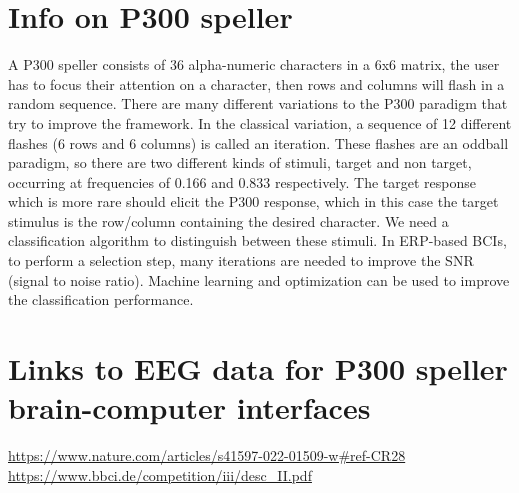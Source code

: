 \documentclass{article}
\begin{document}
\section{Info on P300 speller}
A P300 speller consists of 36 alpha-numeric characters in a 6x6 matrix, the user has to focus their attention on a character, then rows and columns will flash in a random sequence. There are many different variations to the P300 paradigm that try to improve the framework. In the classical variation, a sequence of 12 different flashes (6 rows and 6 columns) is called an iteration. These flashes are an oddball paradigm, so there are two different kinds of stimuli, target and non target, occurring at frequencies of 0.166 and 0.833 respectively. The target response which is more rare should elicit the P300 response, which in this case the target stimulus is the row/column containing the desired character. We need a classification algorithm to distinguish between these stimuli. In ERP-based BCIs, to perform a selection step, many iterations are needed to improve the SNR (signal to noise ratio). Machine learning and optimization can be used to improve the classification performance.\\
\section{Links to EEG data for P300 speller brain-computer interfaces}
\url{https://www.nature.com/articles/s41597-022-01509-w#ref-CR28} \\
\url{https://www.bbci.de/competition/iii/desc_II.pdf} \\ \\
\end{document}
